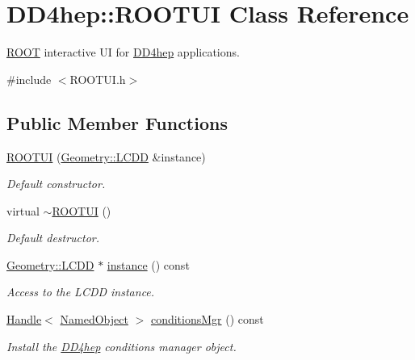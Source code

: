 \hypertarget{class_d_d4hep_1_1_r_o_o_t_u_i}{
\section{DD4hep::ROOTUI Class Reference}
\label{class_d_d4hep_1_1_r_o_o_t_u_i}
}


\hyperlink{namespace_r_o_o_t}{ROOT} interactive UI for \hyperlink{namespace_d_d4hep}{DD4hep} applications.  


{\ttfamily \#include $<$ROOTUI.h$>$}\subsection*{Public Member Functions}
\begin{DoxyCompactItemize}
\item 
\hyperlink{class_d_d4hep_1_1_r_o_o_t_u_i_ab1850fd130f80807ff936d85f307e3e0}{ROOTUI} (\hyperlink{class_d_d4hep_1_1_geometry_1_1_l_c_d_d}{Geometry::LCDD} \&instance)
\begin{DoxyCompactList}\small\item\em Default constructor. \item\end{DoxyCompactList}\item 
virtual \hyperlink{class_d_d4hep_1_1_r_o_o_t_u_i_a029c3848c27bda2a4d12e706918c109f}{$\sim$ROOTUI} ()
\begin{DoxyCompactList}\small\item\em Default destructor. \item\end{DoxyCompactList}\item 
\hyperlink{class_d_d4hep_1_1_geometry_1_1_l_c_d_d}{Geometry::LCDD} $\ast$ \hyperlink{class_d_d4hep_1_1_r_o_o_t_u_i_ab1866996cf6e9cc337a67373fde2e83e}{instance} () const 
\begin{DoxyCompactList}\small\item\em Access to the LCDD instance. \item\end{DoxyCompactList}\item 
\hyperlink{class_d_d4hep_1_1_handle}{Handle}$<$ \hyperlink{class_d_d4hep_1_1_named_object}{NamedObject} $>$ \hyperlink{class_d_d4hep_1_1_r_o_o_t_u_i_a8a768db5f211c292dc2a752e6339eec6}{conditionsMgr} () const 
\begin{DoxyCompactList}\small\item\em Install the \hyperlink{namespace_d_d4hep}{DD4hep} conditions manager object. \item\end{DoxyCompactList}\item 

\end{DoxyCompactItemize}
